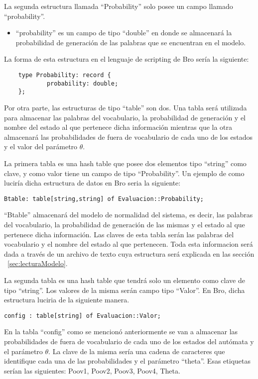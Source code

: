 La segunda estructura llamada “Probability” solo posee un campo llamado “probability”.

\begin{itemize}
\item “probability” es un campo de tipo “double” en donde se almacenará la probabilidad de generación de las palabras que se encuentran en el modelo.
\end{itemize}

La forma de esta estructura en el lenguaje de scripting de Bro sería la siguiente:
\begin{verbatim}
    type Probability: record {
            probability: double;
    };
\end{verbatim}

Por otra parte, las estructuras de tipo “table” son dos. Una tabla será utilizada para almacenar las palabras del vocabulario, la probabilidad de generación y el nombre del estado al que pertenece dicha información mientras que la otra almacenará las probabilidades de fuera de vocabulario de cada uno de los estados y el valor del parámetro $\theta$.

La primera tabla es una hash table que posee dos elementos tipo “string” como clave, y como valor tiene un campo de tipo “Probability”. Un ejemplo de como luciría dicha estructura de datos en Bro seria la siguiente:

\begin{verbatim}
Btable: table[string,string] of Evaluacion::Probability;
\end{verbatim}

“Btable” almacenará del modelo de normalidad del sistema, es decir, las palabras del vocabulario, la probabilidad de generación de las mismas y el estado al que pertenece dicha información. Las claves de esta tabla serán las palabras del vocabulario y el nombre del estado al que pertenecen. Toda esta informacion será dada a través de un archivo de texto cuya estructura será explicada en las sección ~\ref{sec:lecturaModelo}.

La segunda tabla es una hash table que tendrá solo un elemento como clave de tipo “string”. Los valores de la misma serán campo tipo “Valor”. En Bro, dicha estructura luciria de la siguiente manera.

\begin{verbatim}
config : table[string] of Evaluacion::Valor;
\end{verbatim}

En la tabla “config” como se mencionó anteriormente se van a almacenar las probabilidades de fuera de vocabulario de cada uno de los estados del autómata y el parámetro $\theta$. La clave de la misma sería una cadena de caracteres que identifique cada una de las probabilidades  y el parámetro “theta”. Esas etiquetas serían las siguientes: Poov1, Poov2, Poov3, Poov4, Theta.  

